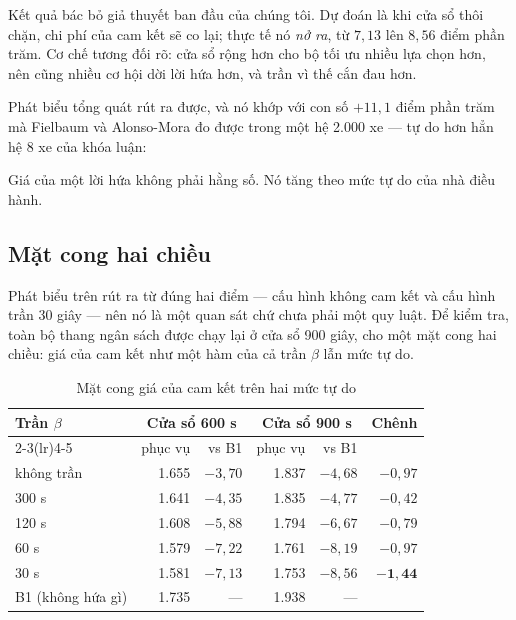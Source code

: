 Kết quả bác bỏ giả thuyết ban đầu của chúng tôi. Dự đoán là khi cửa sổ thôi chặn, chi phí của
cam kết sẽ co lại; thực tế nó \emph{nở ra}, từ $7{,}13$ lên $8{,}56$ điểm phần trăm. Cơ chế
tương đối rõ: cửa sổ rộng hơn cho bộ tối ưu nhiều lựa chọn hơn, nên cũng nhiều cơ hội dời lời
hứa hơn, và trần vì thế cắn đau hơn.

Phát biểu tổng quát rút ra được, và nó khớp với con số $+11{,}1$ điểm phần trăm mà Fielbaum và
Alonso-Mora đo được trong một hệ 2.000 xe --- tự do hơn hẳn hệ 8 xe của khóa luận:

\begin{khungy}
Giá của một lời hứa không phải hằng số. Nó tăng theo mức tự do của nhà điều hành.
\end{khungy}

\subsection{Mặt cong hai chiều}
\label{muc:matcong}

Phát biểu trên rút ra từ đúng hai điểm --- cấu hình không cam kết và cấu hình trần 30 giây ---
nên nó là một quan sát chứ chưa phải một quy luật. Để kiểm tra, toàn bộ thang ngân sách được
chạy lại ở cửa sổ 900 giây, cho một mặt cong hai chiều: giá của cam kết như một hàm của cả trần
$\beta$ lẫn mức tự do.

\begin{table}[htbp]
\centering
\caption{Mặt cong giá của cam kết trên hai mức tự do}
\label{bang:matcong}
\small
\begin{tabular}{@{}lrrrrr@{}}
\toprule
\multirow{2}{*}{\textbf{Trần $\beta$}} & \multicolumn{2}{c}{\textbf{Cửa sổ 600 s}} & \multicolumn{2}{c}{\textbf{Cửa sổ 900 s}} & \multirow{2}{*}{\textbf{Chênh}}\\
\cmidrule(lr){2-3}\cmidrule(lr){4-5}
 & phục vụ & vs B1 & phục vụ & vs B1 & \\
\midrule
không trần & 1.655 & $-3{,}70$ & 1.837 & $-4{,}68$ & $-0{,}97$\\
300 s & 1.641 & $-4{,}35$ & 1.835 & $-4{,}77$ & $-0{,}42$\\
120 s & 1.608 & $-5{,}88$ & 1.794 & $-6{,}67$ & $-0{,}79$\\
60 s & 1.579 & $-7{,}22$ & 1.761 & $-8{,}19$ & $-0{,}97$\\
30 s & 1.581 & $-7{,}13$ & 1.753 & $-8{,}56$ & $\mathbf{-1{,}44}$\\
\midrule
B1 (không hứa gì) & 1.735 & --- & 1.938 & --- & \\
\bottomrule
\end{tabular}
\end{table}

